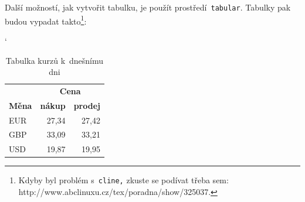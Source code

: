 \documentclass[a4paper, 11pt]{article}
\begin{document}
Další možností, jak vytvořit tabulku, je použít prostředí\texttt{ tabular}. Tabulky pak 
budou vypadat takto\footnote{Kdyby byl problém s\texttt{ cline,} zkuste se podívat třeba sem:
http://www.abclinuxu.cz/tex/poradna/show/325037.}:

\bigskip
\begin{table}[h]
\begin{center}
\catcode`
\begin{tabular}{| l | r | r |} \hline
& \multicolumn{2}{|c|}{\textbf{Cena}} \\ \cline{2-3}
\textbf{Měna} & \textbf{nákup} & \textbf{prodej} \\ \hline
    EUR & 27,34 & 27,42\\
    GBP & 33,09 & 33,21\\
    USD & 19,87 & 19,95\\ \hline
\end{tabular}
\caption{Tabulka kurzů k~dnešnímu dni}
\label{kurzy}
\end{center}
\end{table}
\end{document}
